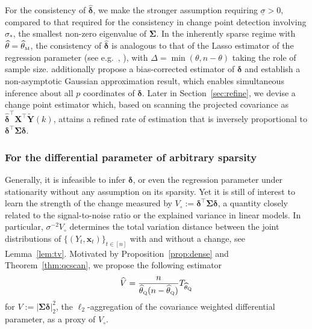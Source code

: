\documentclass[11pt, a4paper]{article}
\newcommand{\mbf}{\mathbf}
\def\wh{\widehat}
\def\wt{\widetilde}
\newcommand{\cp}{\theta}
\newcommand{\Mc}{\text{\tiny \upshape M}} %
\newcommand{\Qc}{\text{\tiny \upshape Q}} %
\theoremstyle{definition}
\theoremstyle{definition}
\theoremstyle{definition}
\theoremstyle{definition}
\theoremstyle{definition}
\theoremstyle{remark}
\theoremstyle{definition}
\theoremstyle{definition}
\theoremstyle{definition}
\begin{document}
For the consistency of $\wh{\bm\delta}$, we make the stronger assumption requiring $\underline{\sigma} > 0$, compared to that required for the consistency in change point detection involving $\sigma_*$, the smallest non-zero eigenvalue of $\bm\Sigma$.
In the inherently sparse regime with $\wh\cp = \wh\cp_{\Mc}$, the consistency of $\wh{\bm\delta}$ is analogous to that of the Lasso estimator of the regression parameter (see e.g.\ \citeauthor{bickel2009simultaneous}, \citeyear{bickel2009simultaneous}), with $\Delta = \min(\cp, n - \cp)$ taking the role of sample size.
\cite{cho2024detection} additionally propose a bias-corrected estimator of $\bm\delta$ and establish a non-asymptotic Gaussian approximation result, which enables simultaneous inference about all $p$ coordinates of $\bm\delta$. 
Later in Section~\ref{sec:refine}, we devise a change point estimator which, based on scanning the projected covariance as $\wh{\bm\delta}^\top \mbf X^\top \wt{\mbf Y}(k)$, attains a refined rate of estimation that is inversely proportional to $\bm\delta^\top \bm\Sigma \bm\delta$. %

\subsubsection{For the differential parameter of arbitrary sparsity}
\label{sec:post:dense}

Generally, it is infeasible to infer $\bm\delta$, or even the regression parameter under stationarity without any assumption on its sparsity.
Yet it is still of interest to learn the strength of the change measured by $V_\circ := \bm\delta^\top \bm\Sigma \bm\delta$, a quantity closely related to the signal-to-noise ratio or the explained variance in linear models. 
In particular, $\sigma^{-2} V_\circ$ determines the total variation distance between the joint distributions of $\{(Y_t, \mbf x_t)\}_{t \in [n]}$ with and without a change, see Lemma~\ref{lem:tv}.
Motivated by Proposition~\ref{prop:dense} and Theorem~\ref{thm:qcscan}, we propose the following estimator 
\begin{align*}
\wh{V} = \frac{n}{\wh\cp_{\Qc} (n - \wh\cp_{\Qc})} T_{\wh\cp_{\Qc}}
\end{align*}
for $V := \vert \bm\Sigma \bm\delta \vert_2^2$, the $\ell_2$-aggregation of the covariance weighted differential parameter, as a proxy of $V_\circ$.
\end{document}

